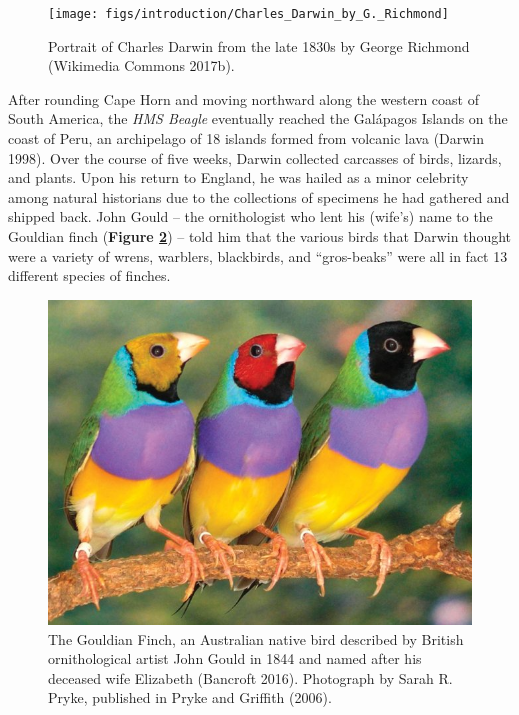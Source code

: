 \documentclass[
]{book}
\begin{document}
\begin{figure}

{\centering \texttt{[image: figs/introduction/Charles\_Darwin\_by\_G.\_Richmond]} 

}

\caption{Portrait of Charles Darwin from the late 1830s by George Richmond (Wikimedia Commons 2017b).}\label{fig:charles-darwin-young-portrait}
\end{figure}

After rounding Cape Horn and moving northward along the western coast of South America, the \emph{HMS Beagle} eventually reached the Galápagos Islands on the coast of Peru, an archipelago of 18 islands formed from volcanic lava (Darwin 1998). Over the course of five weeks, Darwin collected carcasses of birds, lizards, and plants. Upon his return to England, he was hailed as a minor celebrity among natural historians due to the collections of specimens he had gathered and shipped back. John Gould -- the ornithologist who lent his (wife's) name to the Gouldian finch (\textbf{Figure \ref{fig:gouldian-finch}}) -- told him that the various birds that Darwin thought were a variety of wrens, warblers, blackbirds, and ``gros-beaks'' were all in fact 13 different species of finches.



\begin{figure}

{\centering \includegraphics[width=1\linewidth]{figs/introduction/gouldian_finch} 

}

\caption{The Gouldian Finch, an Australian native bird described by British ornithological artist John Gould in 1844 and named after his deceased wife Elizabeth (Bancroft 2016). Photograph by Sarah R. Pryke, published in Pryke and Griffith (2006).}\label{fig:gouldian-finch}
\end{figure}
\end{document}
